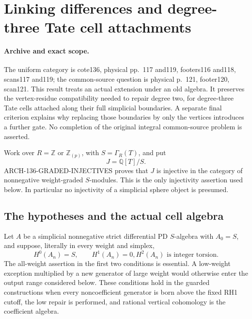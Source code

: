 \section{Linking differences and degree-three Tate cell attachments}
\label{sec:136-degree-three-linking-repair}

\paragraph{Archive and exact scope.}
The uniform category is cote136, physical pp.~117 and119,
footers116 and118, scans117 and119; the common-source question
is physical p.~121, footer120, scan121.  This result treats
an actual extension under an old algebra.  It preserves the
vertex-residue compatibility needed to repair degree two,
for degree-three Tate cells attached along their full simplicial
boundaries.  A separate final criterion explains why replacing
those boundaries by only the vertices introduces a further gate.
No completion of the original integral common-source problem
is asserted.

Work over \(R=\mathbb Z\) or \(\mathbb Z_{(p)}\), with
\(S=\Gamma_R(T)\), and put
\[
                         J=\mathbb Q[T]/S.
                                                               \tag{136.LK1}
\]
ARCH-136-GRADED-INJECTIVES proves that \(J\) is injective
in the category of nonnegative weight-graded \(S\)-modules.
This is the only injectivity assertion used below.  In particular
no injectivity of a simplicial sphere object is presumed.

\subsection{The hypotheses and the actual cell algebra}

Let \(A\) be a simplicial nonnegative strict differential
PD \(S\)-algebra with \(A_0=S\), and suppose, literally
in every weight and simplex,
\[
 H^0(A_n)=S,\qquad H^1(A_n)=0,
                 H^2(A_n)\text{ is integer torsion}.
                                                               \tag{136.LK2}
\]
The all-weight assertion in the first two conditions is essential.
A low-weight exception multiplied by a new generator of large
weight would otherwise enter the output range considered below.
These conditions hold in the guarded constructions when every
noncoefficient generator is born above the fixed RH1 cutoff,
the low repair is performed, and rational vertical cohomology
is the coefficient algebra.

